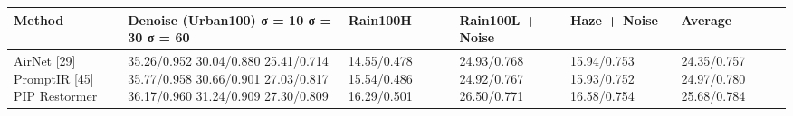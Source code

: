 \begin{tabular}{llllll}
\toprule
Method & Denoise (Urban100) σ = 10 σ = 30 σ = 60 & Rain100H & Rain100L + Noise & Haze + Noise & Average \\
\midrule
AirNet [29] PromptIR [45] PIP Restormer & 35.26/0.952 30.04/0.880 25.41/0.714 35.77/0.958 30.66/0.901 27.03/0.817 36.17/0.960 31.24/0.909 27.30/0.809 & 14.55/0.478 15.54/0.486 16.29/0.501 & 24.93/0.768 24.92/0.767 26.50/0.771 & 15.94/0.753 15.93/0.752 16.58/0.754 & 24.35/0.757 24.97/0.780 25.68/0.784 \\
\bottomrule
\end{tabular}
